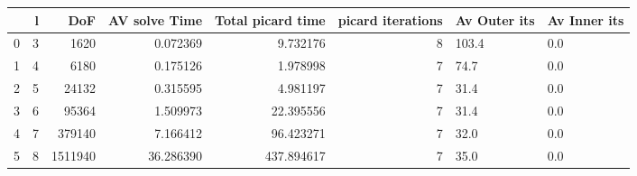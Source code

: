 \begin{tabular}{lrrrrrll}
\toprule
{} &  l &      DoF &  AV solve Time &  Total picard time &  picard iterations & Av Outer its & Av Inner its \\
\midrule
0 &  3 &     1620 &       0.072369 &           9.732176 &                  8 &        103.4 &          0.0 \\
1 &  4 &     6180 &       0.175126 &           1.978998 &                  7 &         74.7 &          0.0 \\
2 &  5 &    24132 &       0.315595 &           4.981197 &                  7 &         31.4 &          0.0 \\
3 &  6 &    95364 &       1.509973 &          22.395556 &                  7 &         31.4 &          0.0 \\
4 &  7 &   379140 &       7.166412 &          96.423271 &                  7 &         32.0 &          0.0 \\
5 &  8 &  1511940 &      36.286390 &         437.894617 &                  7 &         35.0 &          0.0 \\
\bottomrule
\end{tabular}
